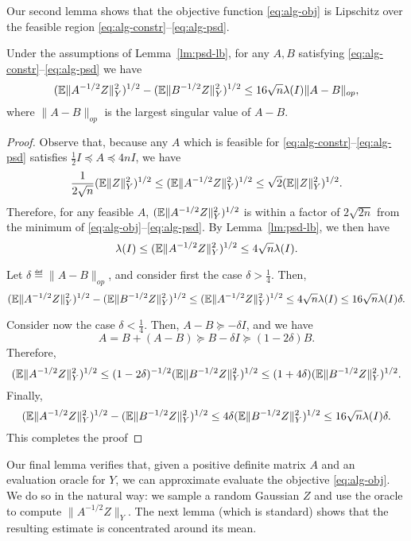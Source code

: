 Our second lemma shows that the objective function \eqref{eq:alg-obj}
is Lipschitz over the feasible region
\eqref{eq:alg-constr}--\eqref{eq:alg-psd}.
\begin{lemma}
  Under the assumptions of Lemma~\ref{lm:psd-lb}, for any $A, B$
  satisfying \eqref{eq:alg-constr}--\eqref{eq:alg-psd} we have
  \[
  (\mathbb{E}\|A^{-1/2}Z\|_Y^2)^{1/2} -   (\mathbb{E}\|B^{-1/2}Z\|_Y^2)^{1/2} \le 
  16\sqrt{n}\lambda(I) \|A  - B\|_{op},
  \]
  where $\|A - B\|_{op}$ is the largest singular value of $A-B$.
\end{lemma}
\begin{proof}
  Observe that, because any $A$ which is feasible for
  \eqref{eq:alg-constr}--\eqref{eq:alg-psd} satisfies $\frac12 I
  \preceq A \preceq 4nI$, we have
  \[
  \frac{1}{2\sqrt{n}}(\mathbb{E}\|Z\|_Y^2)^{1/2} 
  \le (\mathbb{E}\|A^{-1/2}Z\|_Y^2)^{1/2}  \le \sqrt{2} (\mathbb{E}\|Z\|_Y^2)^{1/2}. 
  \]
  Therefore, for any feasible $A$, $(\mathbb{E}\|A^{-1/2}Z\|_Y^2)^{1/2}$ is
  within a factor of $2\sqrt{2n}$ from the minimum of
  \eqref{eq:alg-obj}--\eqref{eq:alg-psd}. By Lemma~\ref{lm:psd-lb}, we
  then have
  \[
  \lambda(I)\le (\mathbb{E}\|A^{-1/2}Z\|_Y^2)^{1/2}
  \le 4 \sqrt{n} \lambda(I).
  \]
  
  Let $\delta \eqdef \|A - B\|_{op}$, and consider first the case
  $\delta > \frac14$.  Then, 
  \[
  (\mathbb{E}\|A^{-1/2}Z\|_Y^2)^{1/2} -   (\mathbb{E}\|B^{-1/2}Z\|_Y^2)^{1/2} 
  \le 
  (\mathbb{E}\|A^{-1/2}Z\|_Y^2)^{1/2} \le 
  4 \sqrt{n} \lambda(I)
  \le 16 \sqrt{n} \lambda(I) \delta.
  \]

  Consider now the case $\delta < \frac14$. Then, $A - B \succeq
  -\delta I$, and we have
  \[
  A = B + (A-B) \succeq B - \delta I \succeq (1 - 2\delta) B.
  \]
  Therefore, 
  \[
  (\mathbb{E}\|A^{-1/2}Z\|_Y^2)^{1/2} 
  \le (1-2\delta)^{-1/2} (\mathbb{E}\|B^{-1/2}Z\|_Y^2)^{1/2}
  \le (1+4\delta) (\mathbb{E}\|B^{-1/2}Z\|_Y^2)^{1/2}.
  \]
  Finally,
  \[
  (\mathbb{E}\|A^{-1/2}Z\|_Y^2)^{1/2} -   (\mathbb{E}\|B^{-1/2}Z\|_Y^2)^{1/2} 
  \le
  4\delta (\mathbb{E}\|B^{-1/2}Z\|_Y^2)^{1/2} 
  \le
  16\sqrt{n} \lambda(I) \delta .
  \]
  This completes the proof
\end{proof}

Our final lemma verifies that, given a positive definite matrix $A$
and an evaluation oracle for $Y$, we can approximate evaluate the objective
\eqref{eq:alg-obj}. We do so in the natural way: we sample a random
Gaussian $Z$ and use the oracle to compute $\|A^{-1/2}Z\|_Y$. The next
lemma (which is standard) shows that the resulting estimate is
concentrated around its mean. 

